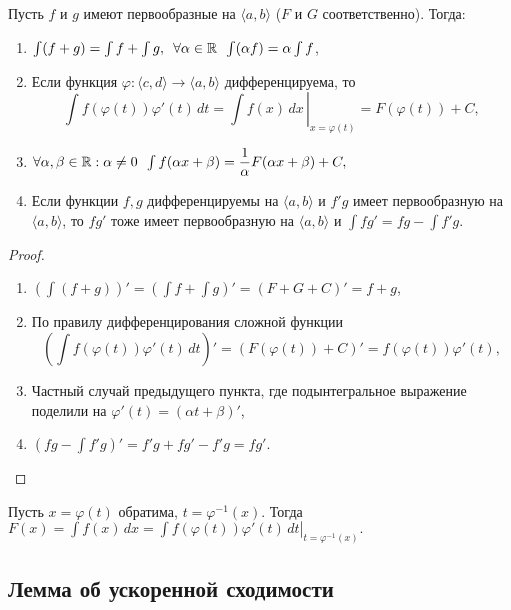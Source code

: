 \begin{ntheorem} \hypertarget{t1_2}{}
	Пусть \(f\) и \(g\) имеют первообразные на \(\langle a, b \rangle\) (\(F\) и \(G\) соответственно). Тогда:
	\begin{enumerate}
		\item \(\int (f + g) = \int f + \int g, \enskip \forall \alpha \in \mathbb{R} \enskip \int (\alpha f) = \alpha \int f\),
		\item Если функция \(\varphi \colon \langle c, d \rangle \to \langle a, b \rangle\) дифференцируема, то \[
		\int f(\varphi(t)) \varphi'(t) \, dt = \left. \int f(x) \, dx \, \right|_{x=\varphi(t)} = F(\varphi(t)) + C,
		\]
		\item \(\forall \alpha, \beta \in \mathbb{R} : \alpha \neq 0 \enskip \int f(\alpha x + \beta) = \dfrac1\alpha F(\alpha x + \beta) + C,\) 
		\item Если функции \(f, g\) дифференцируемы на \(\langle a, b \rangle\) и \(f'g\) имеет первообразную на \(\langle a, b \rangle\), то \(fg'\) тоже имеет первообразную на \(\langle a, b \rangle\) и \(\int fg' = fg - \int f'g\).
	\end{enumerate}
\end{ntheorem}
\begin{proof}
	\begin{enumerate}
		\item \(\left(\int (f + g) \right)' = \left(\int f + \int g \right)' = (F + G + C)' = f + g\),
		\item По правилу дифференцирования сложной функции \[
		\left(\int f(\varphi(t)) \varphi'(t) \, dt \right)' = (F(\varphi(t)) + C )' = f(\varphi(t)) \varphi'(t),
		\]
		\item Частный случай предыдущего пункта, где подынтегральное выражение поделили на \(\varphi'(t) = (\alpha t + \beta)'\),
		\item \(\left(fg - \int f'g \right)' = f'g + fg' - f'g = fg'\).
	\end{enumerate}
\end{proof}

\begin{remark}
	Пусть $x = \varphi(t)$ обратима, $t = \varphi^{-1}(x)$. Тогда \(
	F(x) = \int f(x) \, dx = \left. \int f(\varphi(t)) \varphi'(t) \, dt \right|_{t=\varphi^{-1}(x)}.
	\)
\end{remark}

\subsection{Лемма об ускоренной сходимости}

